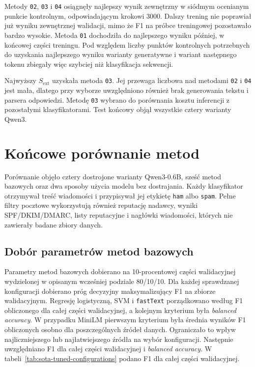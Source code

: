Metody \texttt{02}, \texttt{03} i \texttt{04} osiągnęły najlepszy wynik
zewnętrzny w siódmym ocenianym punkcie kontrolnym, odpowiadającym krokowi 3000.
Dalszy trening nie poprawiał już wyniku zewnętrznej walidacji, mimo że F1 na
próbce treningowej pozostawało bardzo wysokie. Metoda \texttt{01} dochodziła
do najlepszego wyniku później, w końcowej części treningu. Pod względem liczby
punktów kontrolnych potrzebnych do uzyskania najlepszego wyniku warianty
generatywne i wariant następnego tokenu zbiegały więc szybciej niż klasyfikacja
sekwencji.

Najwyższy \(S_{\mathrm{ext}}\) uzyskała metoda \texttt{03}. Jej przewaga
liczbowa nad metodami \texttt{02} i \texttt{04} jest mała, dlatego przy wyborze
uwzględniono również brak generowania tekstu i parsera odpowiedzi. Metodę
\texttt{03} wybrano do porównania kosztu inferencji z pozostałymi
klasyfikatorami. Test końcowy objął wszystkie cztery warianty Qwen3.

\section{Końcowe porównanie metod}

Porównanie objęło cztery dostrojone warianty Qwen3-0.6B, sześć metod bazowych
oraz dwa sposoby użycia modelu bez dostrajania. Każdy klasyfikator otrzymywał
treść wiadomości i przypisywał jej etykietę \texttt{ham} albo \texttt{spam}.
Pełne filtry pocztowe wykorzystują również reputację nadawcy, wyniki
SPF/DKIM/DMARC, listy reputacyjne i nagłówki wiadomości, których nie zawierały
badane zbiory danych.

\subsection{Dobór parametrów metod bazowych}

Parametry metod bazowych dobierano na 10-procentowej części walidacyjnej
wydzielonej w opisanym wcześniej podziale 80/10/10. Dla każdej sprawdzanej
konfiguracji dobierano próg decyzyjny maksymalizujący F1 na zbiorze
walidacyjnym. Regresję logistyczną, SVM i
\texttt{fastText} porządkowano według F1 obliczonego dla całej części
walidacyjnej, a kolejnym kryterium była \emph{balanced accuracy}. W przypadku
MiniLM pierwszym kryterium była średnia wyników F1 obliczonych osobno dla
poszczególnych źródeł danych. Ograniczało to wpływ najliczniejszego lub
najłatwiejszego źródła na wybór konfiguracji. Następnie uwzględniano F1 dla
całej części walidacyjnej i \emph{balanced accuracy}. W
tabeli~\ref{tab:sota-tuned-configurations} podano F1 dla całej części
walidacyjnej.

